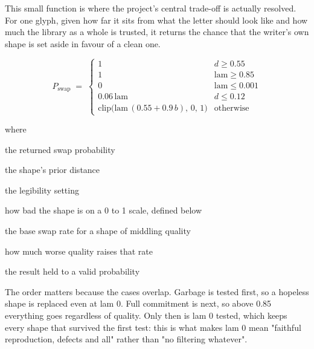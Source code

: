 This small function is where the project's central trade-off is actually resolved. For one glyph, given how far it sits from what the letter should look like and how much the library as a whole is trusted, it returns the chance that the writer's own shape is set aside in favour of a clean one.



\begin{equation}
P_{\mathrm{swap}} \;=\; \begin{cases} 1 & d \ge 0.55 \\[3pt] 1 & \mathrm{lam} \ge 0.85 \\[3pt] 0 & \mathrm{lam} \le 0.001 \\[3pt] 0.06\,\mathrm{lam} & d \le 0.12 \\[3pt] \mathrm{clip}\big(\mathrm{lam}\,(0.55 + 0.9\,b),\,0,\,1\big) & \text{otherwise} \end{cases}
\end{equation}

\noindent where
\begin{description}[leftmargin=2.4em,style=nextline,font=\normalfont\ttfamily]\setlength\itemsep{1pt}
  \item[{$P_{\mathrm{swap}}$}] \normalfont the returned swap probability
  \item[{$d$}] \normalfont the shape's prior distance
  \item[{$\mathrm{lam}$}] \normalfont the legibility setting
  \item[{$b$}] \normalfont how bad the shape is on a 0 to 1 scale, defined below
  \item[{$0.55$}] \normalfont the base swap rate for a shape of middling quality
  \item[{$0.9$}] \normalfont how much worse quality raises that rate
  \item[{$\mathrm{clip}(\cdot,0,1)$}] \normalfont the result held to a valid probability
\end{description}
The order matters because the cases overlap. Garbage is tested first, so a hopeless shape is replaced even at lam 0. Full commitment is next, so above 0.85 everything goes regardless of quality. Only then is lam 0 tested, which keeps every shape that survived the first test: this is what makes lam 0 mean "faithful reproduction, defects and all" rather than "no filtering whatever".


